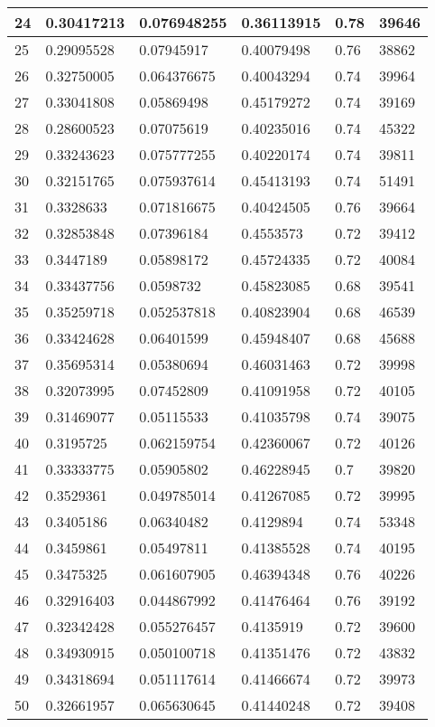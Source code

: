 \begin{longtable}{|l|l|l|l|l|l|}
24 & 0.30417213 & 0.076948255 & 0.36113915 & 0.78 & 39646 \\ \hline 
25 & 0.29095528 & 0.07945917 & 0.40079498 & 0.76 & 38862 \\ \hline 
26 & 0.32750005 & 0.064376675 & 0.40043294 & 0.74 & 39964 \\ \hline 
27 & 0.33041808 & 0.05869498 & 0.45179272 & 0.74 & 39169 \\ \hline 
28 & 0.28600523 & 0.07075619 & 0.40235016 & 0.74 & 45322 \\ \hline 
29 & 0.33243623 & 0.075777255 & 0.40220174 & 0.74 & 39811 \\ \hline 
30 & 0.32151765 & 0.075937614 & 0.45413193 & 0.74 & 51491 \\ \hline 
31 & 0.3328633 & 0.071816675 & 0.40424505 & 0.76 & 39664 \\ \hline 
32 & 0.32853848 & 0.07396184 & 0.4553573 & 0.72 & 39412 \\ \hline 
33 & 0.3447189 & 0.05898172 & 0.45724335 & 0.72 & 40084 \\ \hline 
34 & 0.33437756 & 0.0598732 & 0.45823085 & 0.68 & 39541 \\ \hline 
35 & 0.35259718 & 0.052537818 & 0.40823904 & 0.68 & 46539 \\ \hline 
36 & 0.33424628 & 0.06401599 & 0.45948407 & 0.68 & 45688 \\ \hline 
37 & 0.35695314 & 0.05380694 & 0.46031463 & 0.72 & 39998 \\ \hline 
38 & 0.32073995 & 0.07452809 & 0.41091958 & 0.72 & 40105 \\ \hline 
39 & 0.31469077 & 0.05115533 & 0.41035798 & 0.74 & 39075 \\ \hline 
40 & 0.3195725 & 0.062159754 & 0.42360067 & 0.72 & 40126 \\ \hline 
41 & 0.33333775 & 0.05905802 & 0.46228945 & 0.7 & 39820 \\ \hline 
42 & 0.3529361 & 0.049785014 & 0.41267085 & 0.72 & 39995 \\ \hline 
43 & 0.3405186 & 0.06340482 & 0.4129894 & 0.74 & 53348 \\ \hline 
44 & 0.3459861 & 0.05497811 & 0.41385528 & 0.74 & 40195 \\ \hline 
45 & 0.3475325 & 0.061607905 & 0.46394348 & 0.76 & 40226 \\ \hline 
46 & 0.32916403 & 0.044867992 & 0.41476464 & 0.76 & 39192 \\ \hline 
47 & 0.32342428 & 0.055276457 & 0.4135919 & 0.72 & 39600 \\ \hline 
48 & 0.34930915 & 0.050100718 & 0.41351476 & 0.72 & 43832 \\ \hline 
49 & 0.34318694 & 0.051117614 & 0.41466674 & 0.72 & 39973 \\ \hline 
50 & 0.32661957 & 0.065630645 & 0.41440248 & 0.72 & 39408 \\ \hline 
\end{longtable}